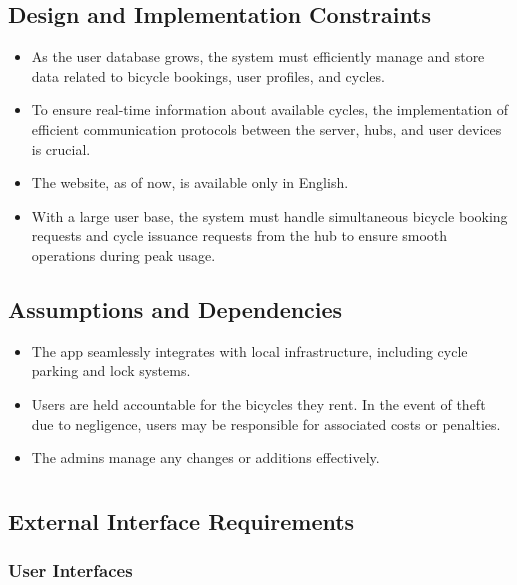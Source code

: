 \documentclass[11pt]{article}
\begin{document}
\subsection{Design and Implementation Constraints}
\begin{itemize}
    \item As the user database grows, the system must efficiently manage and store data related to bicycle bookings, user profiles, and cycles.
    \item To ensure real-time information about available cycles, the implementation of efficient communication protocols between the server, hubs, and user devices is crucial.
    \item The website, as of now, is available only in English.
    \item With a large user base, the system must handle simultaneous bicycle booking requests and cycle issuance requests from the hub to ensure smooth operations during peak usage.

\end{itemize}

\subsection{Assumptions and Dependencies}
\begin{itemize}
    \item The app seamlessly integrates with local infrastructure, including cycle parking and lock systems.
    \item Users are held accountable for the bicycles they rent. In the event of theft due to negligence, users may be responsible for associated costs or penalties.
    \item The admins manage any changes or additions effectively.

\end{itemize}

\newpage
\section{}
\subsection{External Interface Requirements}
\subsubsection{User Interfaces}
\end{document}
